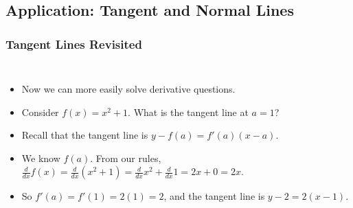 \documentclass[serif,ignorenonframetext]{beamer}
\newcommand{\ds}{\displaystyle}
\begin{document}
\subsection{Application: Tangent and Normal Lines}

\begin{frame}
  \frametitle{Tangent Lines Revisited}
  \begin{columns}
  \begin{itemize}[<+->] 
  \item Now we can more easily solve derivative questions.
  \item Consider $f(x)=x^2+1$.  What is the tangent line at $a=1$?
  \item Recall that the tangent line is $y-f(a)=f'(a)(x-a)$.
  \item We know $f(a)$.  From our rules, 
    $\ds  \frac{d}{dx} f(x) 
    = \frac{d}{dx} (x^2 + 1) 
    = \frac{d}{dx} x^2 + \frac{d}{dx} 1
    = 2x + 0 = 2x$.
  \item So $f'(a)=f'(1)=2(1)=2$, and the 
    tangent line is $y-2=2(x-1)$.
  \end{itemize}

\end{columns}
\end{frame}
\end{document}
